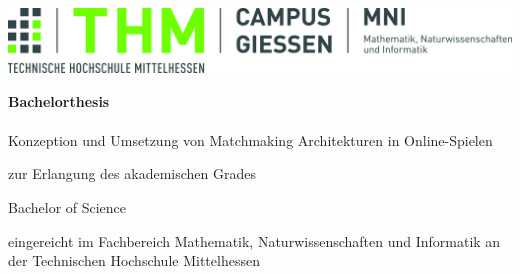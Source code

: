 
\begin{titlepage}

\begin{center}
\includegraphics[width=1\textwidth]{images/Logo_THM_MNI.jpg}
\par\end{center}


\noindent \begin{center}
\vspace{1cm}

\par\end{center}

\noindent \begin{center}
\textsf{\textbf{\huge Bachelorthesis}}\textsf{}\\
\textsf{}\\
\textsf{\Large Konzeption und Umsetzung von Matchmaking Architekturen in Online-Spielen}
\par\end{center}{\Large \par}

\vspace{1cm}


\begin{center}
zur Erlangung des akademischen Grades
\par\end{center}

\begin{center}
{\textsf{\large Bachelor of Science}}
\par\end{center}{\large \par}

\begin{center}
eingereicht im Fachbereich Mathematik, Naturwissenschaften und Informatik an der Technischen Hochschule Mittelhessen{\large \vspace{1cm}
}
\par\end{center}{\large \par}


\end{titlepage}
